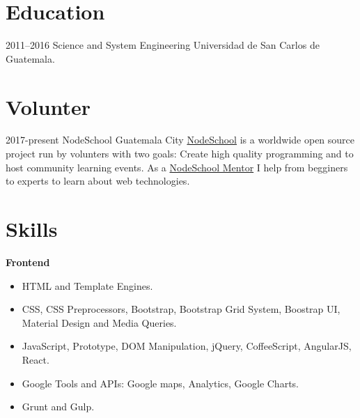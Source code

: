 \documentclass[]{friggeri-cv} %
\begin{document}

\section{Education}

\begin{entrylist}

\entry
	{2011--2016}
	{Science and System Engineering}
	{Universidad de San Carlos de Guatemala.}
	{}
\end{entrylist}

\section{Volunter}
\begin{entrylist}
\entry
	{2017-present}
	{NodeSchool}
	{Guatemala City}
	{
		\href{https://nodeschool.io}{NodeSchool} is a worldwide open source project run by volunters with two goals: Create high quality
		programming and to host community learning events. As a \href{https://nodeschool.io/guatemala/}{NodeSchool Mentor}
		I help from begginers to experts to learn about web technologies.
	}
\end{entrylist}

\clearpage
\section{Skills}

\textbf{Frontend}

\begin{itemize}
	\item HTML and Template Engines.
	\item CSS, CSS Preprocessors, Bootstrap, Bootstrap Grid System, Boostrap UI, Material Design and Media Queries.
	\item JavaScript, Prototype, DOM Manipulation, jQuery, CoffeeScript, AngularJS, React.
	\item Google Tools and APIs: Google maps, Analytics, Google Charts.
	\item Grunt and Gulp.
\end{itemize}
\end{document}
